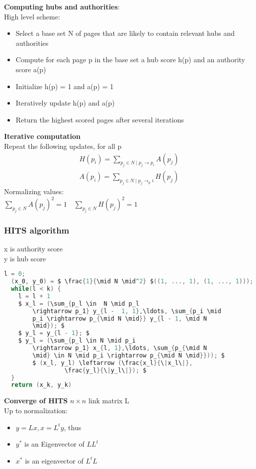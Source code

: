 \textbf{Computing hubs and authorities}: \\
High level scheme:
\begin{itemize}
\item Select a base set N of pages that are likely to contain relevant
  hubs and authorities
\item Compute for each page p in the base set a hub score h(p) and an
  authority score a(p)
\item Initialize h(p) = 1 and a(p) = 1
\item Iteratively update h(p) and a(p)
\item Return the highest scored pages after several iterations
\end{itemize}

\textbf{Iterative computation}\\
Repeat the following updates, for all p
\begin{align*}
  H(p_i) = \sum_{p_j \in N \mid p_j \rightarrow p_i} A(p_j) \\
  A(p_i)= \sum_{p_j \in N \mid p_j \rightarrow _pi} H(p_j)
\end{align*}
Normalizing values: \\
$ \sum_{p_j \in N} A(p_j)^2 = 1 \quad \sum_{p_j \in N} H(p_j)^2 = 1 $

\subsubsection{HITS algorithm}

x is authority score \\
y is hub score \\
\begin{lstlisting}[language=C, basicstyle=\tiny,mathescape=true]
  l = 0;
  (x_0, y_0) = $ \frac{1}{\mid N \mid^2} $((1, ..., 1), (1, ..., 1)));
  while(l < k) {
    l = l + 1
    $ x_l = (\sum_{p_l \in  N \mid p_l
        \rightarrow p_1} y_{l -  1, 1},\ldots, \sum_{p_i \mid
        p_i \rightarrow p_{\mid N \mid}} y_{l - 1, \mid N
        \mid}); $
    $ y_l = y_{l - 1}; $
    $ y_l = (\sum_{p_l \in N \mid p_i
        \rightarrow p_1} x_{l, 1},\ldots, \sum_{p_{\mid N
        \mid} \in N \mid p_i \rightarrow p_{\mid N \mid}})); $
        $ (x_l, y_l) \leftarrow (\frac{x_l}{\|x_l\|},
                 \frac{y_l}{\|y_l\|}); $
  }
  return (x_k, y_k)
\end{lstlisting}

\textbf{Converge of HITS}
$ n \times n $ link matrix L \\
Up to normalization:
\begin{itemize}
\item $ y = Lx, x = L^t y $, thus
\item $ y^* $ is an Eigenvector of $ LL^t $
\item $ x^* $  is an eigenvector of $ L^tL $
\end{itemize}

